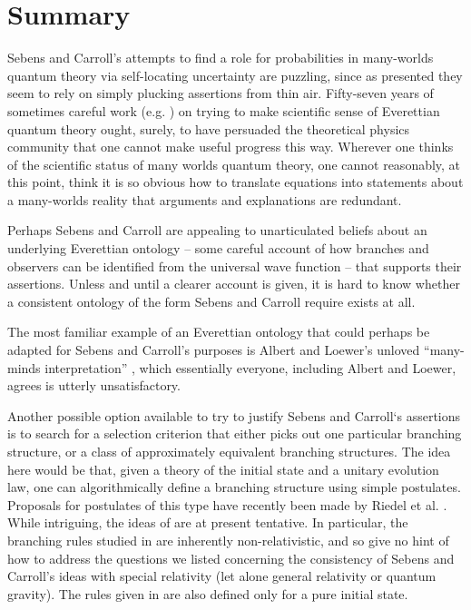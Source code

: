 \documentclass[aps,prl]{revtex4}
\begin{document}
\section{Summary}

Sebens and Carroll's attempts \cite{cs1,cs2} to
find a role for probabilities in many-worlds quantum theory
via self-locating uncertainty are puzzling, since as presented  
they seem to rely on simply plucking assertions from thin air. 
Fifty-seven years of sometimes careful work 
(e.g. \cite{dewittmany,mwbook,geroch1984everett,deutsch1996comment,
gell1990quantum,hartle1991quantum,bell2004speakable,albert1988interpreting})
on trying to make
scientific sense of Everettian quantum theory ought, surely, 
to have persuaded the theoretical physics community
that one cannot make useful progress this way.  
Wherever one thinks of the scientific status of many worlds
quantum theory, one cannot reasonably, at this point, think
it is so obvious how to translate equations into statements about
a many-worlds reality that arguments and explanations are redundant.  

Perhaps Sebens and Carroll are appealing    
to unarticulated beliefs about an underlying Everettian ontology 
-- some careful account of how branches and observers can be 
identified from the universal wave function --
that supports their assertions.   Unless and until
a clearer account is given, it is hard to know whether
a consistent ontology of the form Sebens and Carroll require
exists at all.   

The most familiar
example of an Everettian ontology that could perhaps be adapted
for Sebens and Carroll's purposes is Albert and Loewer's unloved
``many-minds interpretation'' \cite{albert1988interpreting}, which
essentially everyone, including Albert and Loewer, agrees is 
utterly unsatisfactory.  

Another possible option available to try to justify Sebens and Carroll`s
assertions is to search for a selection criterion
that either picks out one particular branching structure, or
a class of approximately equivalent branching structures.
The idea here would be that, given a theory of the initial
state and a unitary evolution law, one can algorithmically
define a branching structure using simple postulates.
Proposals for postulates of this type have recently been
made by Riedel et al. \cite{Riedel:2013uoa}.   
While intriguing, the ideas of \cite{Riedel:2013uoa} are at present tentative.
In particular, the branching rules studied in
\cite{Riedel:2013uoa} are inherently non-relativistic, and so give
no hint of how to address the questions we listed concerning
the consistency of Sebens and Carroll's ideas with special
relativity (let alone general relativity or quantum gravity).
The rules given in \cite{Riedel:2013uoa} are also defined
only for a pure initial state. 
\end{document}
